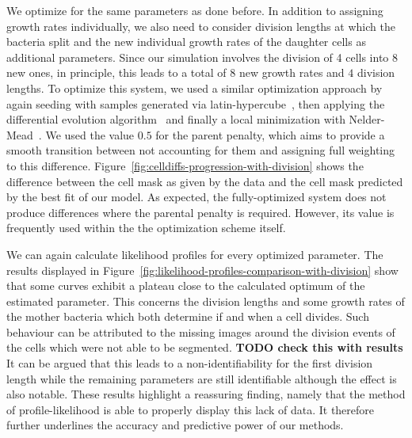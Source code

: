 \documentclass[10pt,letterpaper]{article}
\begin{document}
We optimize for the same parameters as done before.
In addition to assigning growth rates individually, we also need to consider division lengths at
which the bacteria split and the new individual growth rates of the daughter cells as additional
parameters.
Since our simulation involves the division of 4 cells into 8 new ones, in principle, this leads
to a total of $8$ new growth rates and $4$ division lengths.
To optimize this system, we used a similar optimization approach by again seeding with samples
generated via latin-hypercube~\cite{McKay1979}, then applying the differential evolution
algorithm~\cite{Storn1997} and finally a local minimization with Nelder-Mead~\cite{Gao2010}.
We used the value $0.5$ for the parent penalty, which aims to provide a smooth transition between
not accounting for them and assigning full weighting to this difference.
Figure~\ref{fig:celldiffs-progression-with-division} shows the difference between the cell mask as
given by the data and the cell mask predicted by the best fit of our model.
As expected, the fully-optimized system does not produce differences where the parental penalty is
required.
However, its value is frequently used within the the optimization scheme itself.

We can again calculate likelihood profiles for every optimized parameter.
The results displayed in Figure~\ref{fig:likelihood-profiles-comparison-with-division} show that
some curves exhibit a plateau close to the calculated optimum of the estimated parameter.
This concerns the division lengths and some growth rates of the mother bacteria which both determine
if and when a cell divides.
Such behaviour can be attributed to the missing images around the division events of the cells which
were not able to be segmented.
\textbf{TODO check this with results}
It can be argued that this leads to a non-identifiability for the first division length while the
remaining parameters are still identifiable although the effect is also notable.
These results highlight a reassuring finding, namely that the method of profile-likelihood is able
to properly display this lack of data.
It therefore further underlines the accuracy and predictive power of our methods.
\end{document}
